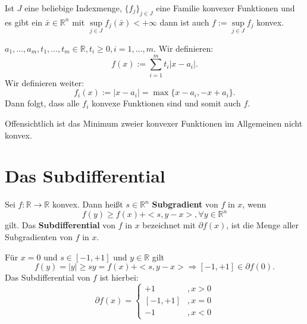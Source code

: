 \begin{Lemma}
 Ist $J$ eine beliebige Indexmenge, $\{f_j\}_{j \in J}$ eine Familie konvexer Funktionen und es gibt ein $\bar{x} 
\in\mathbb{R}^n$ mit $\sup\limits_{j\in J} f_j(\bar{x}) < +\infty$ dann ist auch $f:=\sup\limits_{j\in J} f_j$ konvex.
\end{Lemma}

\begin{Beispiel}
 $a_1,\dots,a_m,t_1,\dots,t_m\in\mathbb{R}, t_i\geq 0,i=1,\dots,m$.
 Wir definieren: 
 \begin{equation}
  f(x) := \sum\limits_{i=1}^mt_i|x-a_i|.
 \end{equation}
 Wir definieren weiter:
 \begin{equation}
  f_i(x):=|x-a_i|= \max\{x-a_i,-x+a_i\}.
 \end{equation}
Dann folgt, dass alle $f_i$ konvexe Funktionen sind und somit auch $f$.
\end{Beispiel}

\begin{Bemerkung}
 Offensichtlich ist das Minimum zweier konvexer Funktionen im Allgemeinen nicht konvex.
\end{Bemerkung}

\section{Das Subdifferential}
\begin{Definition}[Subdifferential]
 Sei $f:\mathbb{R}\rightarrow\mathbb{R}$ konvex. Dann heißt $s\in\mathbb{R}^n$ \textbf{Subgradient} von $f$ in $x$, 
wenn 
 \begin{equation}
  f(y) \geq f(x) + <s,y-x>, \forall y\in\mathbb{R}^n
 \end{equation}
gilt.
Das \textbf{Subdifferential} von $f$ in $x$ bezeichnet mit $\partial f(x)$, ist die Menge aller Subgradienten von $f$ in 
$x$.
\end{Definition}

\begin{Beispiel}[$f(x) = |x|$]
 Für $x=0$ und $s\in[-1,+1]$ und $y\in\mathbb{R}$ gilt
 \begin{equation}
  f(y) = |y| \geq sy = f(x)+<s,y-x> \Rightarrow [-1,+1]\in\partial f(0).
 \end{equation}
 Das Subdifferential von $f$ ist hierbei:
 \begin{equation}
  \partial f(x) = 
  \begin{cases}
   +1 & ,x > 0 \\
   [-1,+1] & ,x=0\\
   -1 & ,x < 0
  \end{cases}
 \end{equation}
\end{Beispiel}

